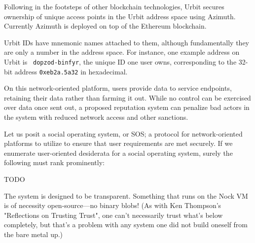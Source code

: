 {{{
Following in the footsteps of other blockchain technologies, Urbit secures ownership of unique access points in the Urbit address space using Azimuth.  Currently Azimuth is deployed on top of the Ethereum blockchain.

Urbit IDs have mnemonic names attached to them, although fundamentally they are only a number in the address space.  For instance, one example address on Urbit is \texttt{~dopzod-binfyr}, the unique ID one user owns, corresponding to the 32-bit address \texttt{0xeb2a.5a32} in hexadecimal.


On this network-oriented platform, users provide data to service endpoints, retaining their data rather than farming it out.  While no control can be exercised over data once sent out, a proposed reputation system can penalize bad actors in the system with reduced network access and other sanctions.

Let us posit a social operating system, or SOS;  a protocol for network-oriented platforms to utilize to ensure that user requirements are met securely.  If we enumerate user-oriented desiderata for a social operating system, surely the following must rank prominently:

TODO

The system is designed to be transparent.  Something that runs on the Nock VM is of necessity open-source—no binary blobs!  (As with Ken Thompson's "Reflections on Trusting Trust", one can't necessarily trust what's below completely, but that's a problem with any system one did not build oneself from the bare metal up.)

}}}
